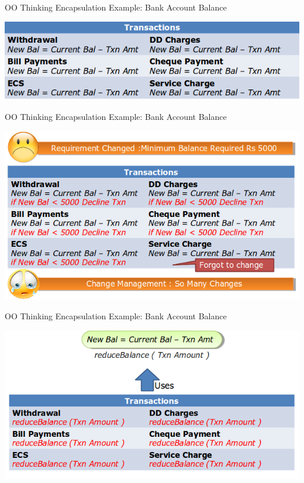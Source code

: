 \documentclass[14pt]{beamer}
\begin{document}
\begin{frame}{OO Thinking}
Encapsulation Example: Bank Account Balance
\begin{center}
    \includegraphics[scale=0.5]{Image22.png}
\end{center}
\end{frame}
\begin{frame}{OO Thinking}
Encapsulation Example: Bank Account Balance
\begin{center}
    \includegraphics[scale=0.5]{Image23.png}
\end{center}
\end{frame}
\begin{frame}{OO Thinking}
Encapsulation Example: Bank Account Balance
\begin{center}
    \includegraphics[scale=0.4]{Image24.png}
\end{center}
\end{frame}
\end{document}
